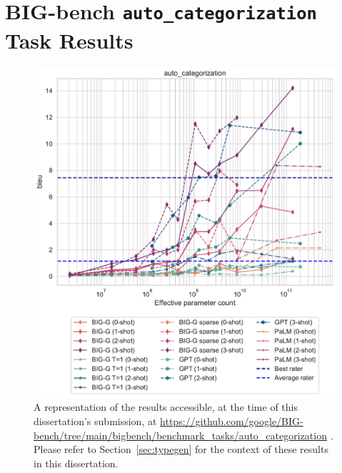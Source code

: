 \chapter{BIG-bench \texttt{auto\_categorization} Task Results}
\label{appendix:bigbench_autocat_results}

\begin{figure}
    \centering
    \includegraphics[width=\columnwidth]{plot__auto_categorization__aggregate__bleu.pdf}
    \caption{A representation of the results accessible, at the time of this dissertation's submission, at \url{https://github.com/google/BIG-bench/tree/main/bigbench/benchmark_tasks/auto_categorization} \citep{bigbench}. Please refer to Section~\ref{sec:typegen} for the context of these results in this dissertation.}
    \label{fig:bigbench_autocat_results}
\end{figure}